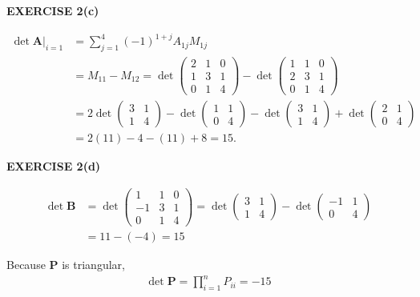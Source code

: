 \documentclass[12pt]{article}
\newcommand{\mat}[1]{\mathbf{#1}}
\newcommand{\exercise}[1]{\textbf{EXERCISE #1}\label{#1}}
\begin{document}
\exercise{2(c)}

\begin{align*}
\det \mat{A} \bigg\rvert_{i=1} &= \sum^{4}_{j=1} (-1)^{1+j} A_{1j} M_{1j} \\
&= M_{11} - M_{12} 
= \det \begin{pmatrix} 2 & 1 & 0 \\ 1 & 3 & 1 \\ 0 & 1 & 4  \end{pmatrix}
- \det \begin{pmatrix} 1 & 1 & 0 \\ 2 & 3 & 1 \\ 0 & 1 & 4  \end{pmatrix} \\
&= 2 \det \begin{pmatrix} 3 & 1 \\ 1 & 4 \end{pmatrix} 
- \det \begin{pmatrix} 1 & 1 \\ 0 & 4 \end{pmatrix} 
- \det \begin{pmatrix} 3 & 1 \\ 1 & 4 \end{pmatrix}
+ \det \begin{pmatrix} 2 & 1 \\ 0 & 4  \end{pmatrix} \\
&= 2 (11) - 4 - (11) + 8 = 15.
\end{align*}

\exercise{2(d)}

\begin{align*}
\det \mat{B} &= \det \begin{pmatrix} 1 & 1 & 0 \\ -1 & 3 & 1 \\ 0 & 1 & 4 \end{pmatrix} 
= \det \begin{pmatrix} 3 & 1 \\ 1 & 4 \end{pmatrix}
- \det \begin{pmatrix} -1 & 1 \\ 0 & 4 \end{pmatrix} \\
&= 11 - (-4) = 15
\end{align*}

Because $\mat{P}$ is triangular,
\begin{align*}
\det \mat{P} = \prod_{i=1}^{n} P_{ii} = -15
\end{align*}
\end{document}
